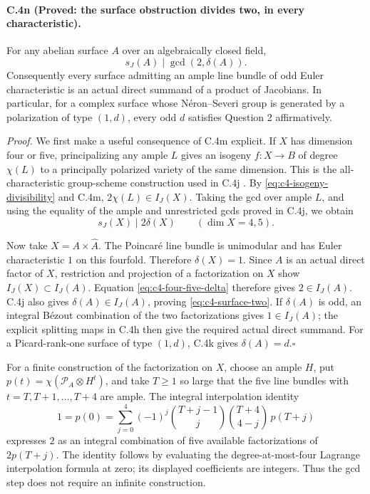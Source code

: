 \paragraph{C.4n (Proved: the surface obstruction divides two, in every characteristic).}
For any abelian surface $A$ over an algebraically closed field,
\begin{equation}\label{eq:c4-surface-two}
 \boxed{\qquad s_J(A)\mid\gcd(2,\delta(A)).\qquad}
\end{equation}
Consequently every surface admitting an ample line bundle of odd
Euler characteristic is an actual direct summand of a product of
Jacobians. In particular, for a complex surface whose
N\'eron--Severi group is generated by a polarization of type $(1,d)$,
every odd $d$ satisfies Question 2 affirmatively.

\emph{Proof.}
We first make a useful consequence of C.4m explicit. If $X$ has
dimension four or five, principalizing any ample $L$ gives an
isogeny $f:X\to B$ of degree $\chi(L)$ to a principally polarized
variety of the same dimension. This is the all-characteristic
group-scheme construction used in C.4j
\citep[Section 23, Theorem 4 and Corollary 1,
pp.~233--234]{frC4Mumford1970}.
By \eqref{eq:c4-isogeny-divisibility} and C.4m,
$2\chi(L)\in I_J(X)$. Taking the gcd over ample $L$, and using
the equality of the ample and unrestricted gcds proved in C.4j,
we obtain
\begin{equation}\label{eq:c4-four-five-delta}
              s_J(X)\mid2\delta(X)\qquad(\dim X=4,5).
\end{equation}

Now take $X=A\times\widehat A$. The Poincar\'e line bundle is
unimodular and has Euler characteristic $1$ on this fourfold.
Therefore $\delta(X)=1$. Since $A$ is an actual direct factor of
$X$, restriction and projection of a factorization on $X$ show
$I_J(X)\subset I_J(A)$. Equation \eqref{eq:c4-four-five-delta}
therefore gives $2\in I_J(A)$.
C.4j also gives $\delta(A)\in I_J(A)$, proving
\eqref{eq:c4-surface-two}. If $\delta(A)$ is odd, an integral
B\'ezout combination of the two factorizations gives $1\in I_J(A)$;
the explicit splitting maps in C.4h then give the required actual
direct summand. For a Picard-rank-one surface of type $(1,d)$,
C.4k gives $\delta(A)=d$.\hfill$\square$

For a finite construction of the factorization on $X$, choose an
ample $H$, put $p(t)=\chi(\mathcal P_A\otimes H^t)$, and take
$T\ge1$ so large that the five line bundles with
$t=T,T+1,\ldots,T+4$ are ample. The integral interpolation identity
\[
 1=p(0)=\sum_{j=0}^{4}(-1)^j
       \binom{T+j-1}{j}\binom{T+4}{4-j}\,p(T+j)
\]
expresses $2$ as an integral combination of five available
factorizations of $2p(T+j)$. The identity follows by evaluating the
degree-at-most-four Lagrange interpolation formula at zero; its
displayed coefficients are integers. Thus the gcd step does not
require an infinite construction.

